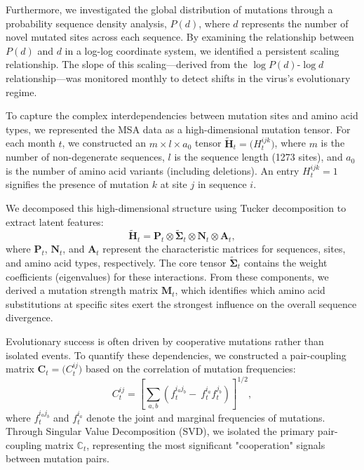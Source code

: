 \documentclass[%
 reprint,
superscriptaddress,
 amsmath,amssymb,
 aps,
]{revtex4-2}
\begin{document}
Furthermore, we investigated the global distribution of mutations through a probability sequence density analysis, $P(\bm{\mathit{d}})$, where $\bm{\mathit{d}}$ represents the number of novel mutated sites across each sequence. By examining the relationship between $P(\bm{\mathit{d}})$ and $\bm{\mathit{d}}$ in a log-log coordinate system, we identified a persistent scaling relationship. The slope of this scaling—derived from the $\log{P(\bm{\mathit{d}})}$-$\log{\bm{\mathit{d}}}$ relationship—was monitored monthly to detect shifts in the virus's evolutionary regime.

To capture the complex interdependencies between mutation sites and amino acid types, we represented the MSA data as a high-dimensional mutation tensor. For each month $t$, we constructed an $m \times l \times a_0$ tensor $\widetilde{\mathbf{H}}_t = \big(H_t^{ijk}\big)$, where $m$ is the number of non-degenerate sequences, $l$ is the sequence length (1273 sites), and $a_0$ is the number of amino acid variants (including deletions). An entry $H_t^{ijk} = 1$ signifies the presence of mutation $k$ at site $j$ in sequence $i$.

We decomposed this high-dimensional structure using Tucker decomposition to extract latent features:
\begin{equation}
    \widetilde{\mathbf{H}}_t = \mathbf{P}_t \otimes \widetilde{\mathbf{\Sigma}}_t \otimes \mathbf{N}_t \otimes \mathbf{A}_t,
\end{equation}
where $\mathbf{P}_t$, $\mathbf{N}_t$, and $\mathbf{A}_t$ represent the characteristic matrices for sequences, sites, and amino acid types, respectively. The core tensor $\widetilde{\mathbf{\Sigma}}_t$ contains the weight coefficients (eigenvalues) for these interactions. From these components, we derived a mutation strength matrix $\mathbf{M}_t$, which identifies which amino acid substitutions at specific sites exert the strongest influence on the overall sequence divergence.

Evolutionary success is often driven by cooperative mutations rather than isolated events. To quantify these dependencies, we constructed a pair-coupling matrix $\mathbf{C}_t = \big(C_t^{ij}\big)$ based on the correlation of mutation frequencies:
\begin{equation}
    C_t^{ij} = {\left[\sum_{a,b}{\left(f_{t}^{i_{a}j_{b}} - \ f_{t}^{i_{a}}f_{t}^{j_{b}}\right)}\right]}^{1/2},
\end{equation}
where $f_{t}^{i_{a}j_{b}}$ and $f_{t}^{i_{a}}$ denote the joint and marginal frequencies of mutations. Through Singular Value Decomposition (SVD), we isolated the primary pair-coupling matrix $\mathbb{C}_t$, representing the most significant "cooperation" signals between mutation pairs.
\end{document}
